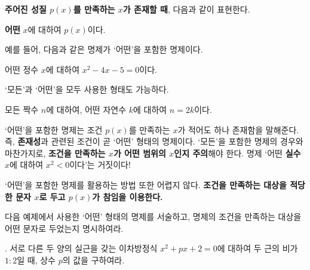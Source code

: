 \textbf{주어진 성질 \(p(x)\)를 만족하는 \(x\)가 존재할 때}, 다음과 같이 표현한다.
\begin{center}
    \textbf{어떤} \(x\)에 대하여 \(p(x)\)이다.
\end{center}
예를 들어, 다음과 같은 명제가 `어떤'을 포함한 명제이다.
\begin{center}
    어떤 정수 \(x\)에 대하여 \(x^2 - 4x - 5 = 0\)이다.
\end{center}
`모든'과 `어떤'을 모두 사용한 형태도 가능하다.
\begin{center}
    모든 짝수 \(n\)에 대하여, 어떤 자연수 \(k\)에 대하여 \(n = 2k\)이다.
\end{center}

`어떤'을 포함한 명제는 조건 \(p(x)\)를 만족하는 \(x\)가 적어도 하나 존재함을 말해준다. 즉, \textbf{존재성}과 관련된 조건이 곧 `어떤' 형태의 명제이다. `모든'을 포함한 명제의 경우와 마찬가지로, \textbf{조건을 만족하는 \(x\)가 어떤 범위의 \(x\)인지 주의}해야 한다. 명제 `어떤 \textbf{실수} \(x\)에 대하여 \(x^2 < 0\)이다'는 거짓이다!

`어떤'을 포함한 명제를 활용하는 방법 또한 어렵지 않다. \textbf{조건을 만족하는 대상을 적당한 문자 \(x\)로 두고 \(p(x)\)가 참임을 이용한다.}

다음 예제에서 사용한 `어떤' 형태의 명제를 서술하고, 명제의 조건을 만족하는 대상을 어떤 문자로 두었는지 명시하여라.

\bigskip

\ex. 서로 다른 두 양의 실근을 갖는 이차방정식 \(x^2 + px + 2 = 0\)에 대하여 두 근의 비가 \(1 : 2\)일 때, 상수 \(p\)의 값을 구하여라.

\pagebreak
